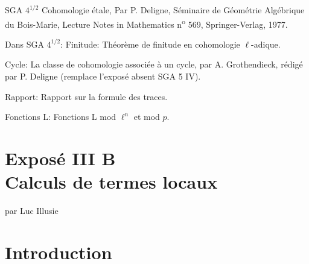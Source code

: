 \documentclass[11pt]{article}
\begin{document}
SGA $4^{1/2}$ Cohomologie étale, Par P. Deligne, Séminaire de Géométrie Algébrique du Bois-Marie, Lecture Notes in Mathematics n\textsuperscript{o} 569, Springer-Verlag, 1977.

Dans SGA $4^{1/2}$: Finitude: Théorème de finitude en cohomologie $\ell$-adique.

Cycle: La classe de cohomologie associée à un cycle, par A. Grothendieck, rédigé par P. Deligne (remplace l'exposé absent SGA 5 IV).

Rapport: Rapport sur la formule des traces.

Fonctions L: Fonctions L mod $\ell^n$ et mod $p$.

\clearpage
\section*{Exposé III B\\Calculs de termes locaux}
\begin{center}
par Luc Illusie
\end{center}

\section*{Introduction}
\end{document}
